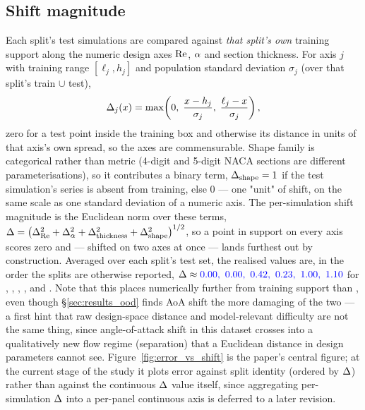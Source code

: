 \documentclass[11pt,a4paper]{article}
\begin{document}
\subsection{Shift magnitude}
Each split's test simulations are compared against \emph{that split's own}
training support along the numeric design axes $\mathrm{Re}$, $\alpha$ and section
thickness. For axis $j$ with training range $[\ell_j, h_j]$ and population
standard deviation $\sigma_j$ (over that split's train $\cup$ test),
\begin{equation}
  \Delta_j(x) = \max\!\left(0,\; \frac{x - h_j}{\sigma_j},\; \frac{\ell_j - x}{\sigma_j}\right),
\end{equation}
zero for a test point inside the training box and otherwise its distance in
units of that axis's own spread, so the axes are commensurable. Shape family is
categorical rather than metric (4-digit and 5-digit NACA sections are different
parameterisations), so it contributes a binary term, $\Delta_{\text{shape}} = 1$
if the test simulation's series is absent from training, else $0$ --- one "unit"
of shift, on the same scale as one standard deviation of a numeric axis. The
per-simulation shift magnitude is the Euclidean norm over these terms,
$\Delta = \big(\Delta_{\mathrm{Re}}^2 + \Delta_{\alpha}^2 + \Delta_{\text{thickness}}^2 +
\Delta_{\text{shape}}^2\big)^{1/2}$, so a point in support on every axis scores
zero and  --- shifted on two axes at once --- lands
furthest out by construction. Averaged over each split's test set, the realised
values are, in the order the splits are otherwise reported,
$\shift \approx \pending{0.00,\ 0.00,\ 0.42,\ 0.23,\ 1.00,\ 1.10}$ for
, , , ,
 and . Note that this places
 numerically further from training support than
, even though \S\ref{sec:results_ood} finds AoA shift the more
damaging of the two --- a first hint that raw design-space distance and
model-relevant difficulty are not the same thing, since angle-of-attack shift
in this dataset crosses into a qualitatively new flow regime (separation) that
a Euclidean distance in design parameters cannot see. Figure~\ref{fig:error_vs_shift}
is the paper's central figure; at the current stage of the study it plots error
against split identity (ordered by $\Delta$) rather than against the continuous
$\Delta$ value itself, since aggregating per-simulation $\Delta$ into a
per-panel continuous axis is deferred to a later revision.
\end{document}
